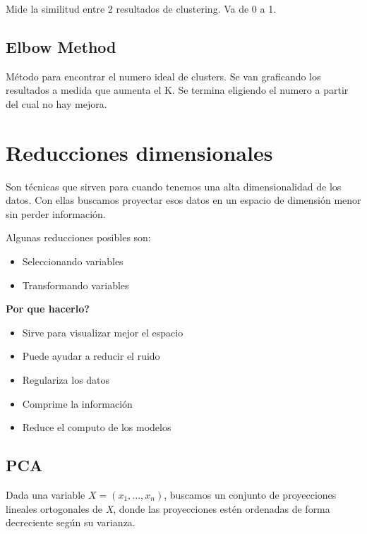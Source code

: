 \documentclass[titlepage,a4paper]{article}
\begin{document}
Mide la similitud entre 2 resultados de clustering. Va de 0 a 1.


\subsection{Elbow Method}
Método para encontrar el numero ideal de clusters. Se van graficando los resultados a medida que aumenta el K. Se termina eligiendo el numero a partir del cual no hay mejora.


\section{Reducciones dimensionales}

Son técnicas que sirven para cuando tenemos una alta dimensionalidad de los datos. Con ellas buscamos proyectar esos datos en un espacio de dimensión menor sin perder información. 

Algunas reducciones posibles son:
\begin{itemize}
    \item Seleccionando variables
    \item Transformando variables
\end{itemize}

\textbf{Por que hacerlo?}

\begin{itemize}
    \item Sirve para visualizar mejor el espacio
    \item Puede ayudar a reducir el ruido
    \item Regulariza los datos
    \item Comprime la información
    \item Reduce el computo de los modelos
\end{itemize}

\subsection{PCA}

Dada una variable \begin{math} X = (x_1,...,x_n) \end{math}, buscamos un conjunto de proyecciones lineales ortogonales de \textit{X}, donde las proyecciones estén ordenadas de forma decreciente según su varianza.
\end{document}
